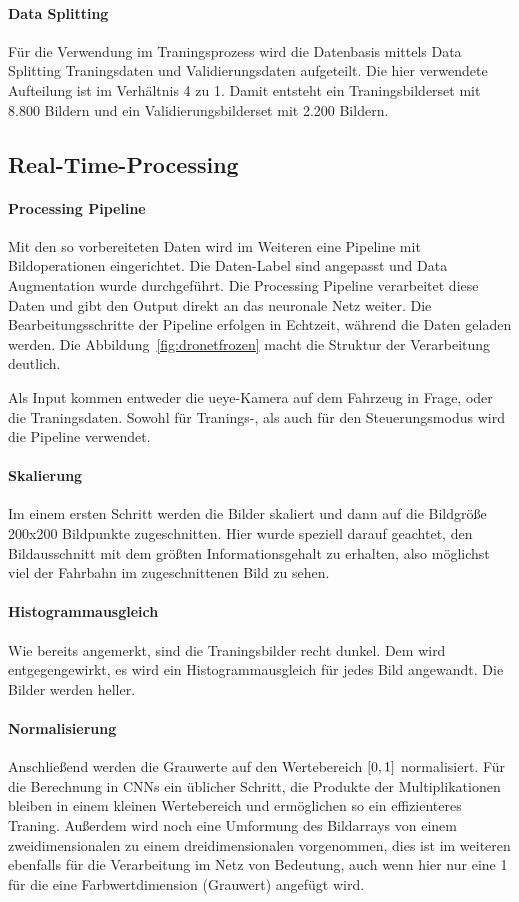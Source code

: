 \paragraph{Data Splitting}
Für die Verwendung im Traningsprozess wird die Datenbasis mittels Data Splitting \cite{picard1990data} \cite{reitermanova2010data}  Traningsdaten und Validierungsdaten aufgeteilt. Die hier verwendete Aufteilung ist im Verhältnis 4 zu 1. Damit entsteht ein Traningsbilderset mit 8.800 Bildern und ein Validierungsbilderset mit 2.200 Bildern.

\subsection{Real-Time-Processing}
\paragraph{Processing Pipeline}
Mit den so vorbereiteten Daten wird im Weiteren eine Pipeline mit Bildoperationen eingerichtet. Die Daten-Label sind angepasst und Data Augmentation wurde durchgeführt. Die Processing Pipeline verarbeitet diese Daten und gibt den Output direkt an das neuronale Netz weiter. Die Bearbeitungsschritte der Pipeline erfolgen in Echtzeit, während die Daten geladen werden. Die Abbildung~\ref{fig:dronetfrozen} macht die Struktur der Verarbeitung deutlich. 

Als Input kommen entweder die ueye-Kamera auf dem Fahrzeug in Frage, oder die Traningsdaten. Sowohl für Tranings-, als auch für den Steuerungsmodus wird die Pipeline verwendet. 

\paragraph{Skalierung}
Im einem ersten Schritt werden die Bilder skaliert und dann auf die Bildgröße 200x200 Bildpunkte zugeschnitten. Hier wurde speziell darauf geachtet, den Bildausschnitt mit dem größten Informationsgehalt zu erhalten, also möglichst viel der Fahrbahn im zugeschnittenen Bild zu sehen.

\paragraph{Histogrammausgleich}
Wie bereits angemerkt, sind die Traningsbilder recht dunkel. Dem wird entgegengewirkt, es wird ein Histogrammausgleich für jedes Bild angewandt. Die Bilder werden heller.

\paragraph{Normalisierung}
Anschließend werden die Grauwerte auf den Wertebereich $\interval{0}{1}$ normalisiert. Für die Berechnung in CNNs ein üblicher Schritt, die Produkte der Multiplikationen bleiben in einem kleinen Wertebereich und ermöglichen so ein effizienteres Traning. Außerdem wird noch eine Umformung des Bildarrays von einem zweidimensionalen zu einem dreidimensionalen vorgenommen, dies ist im weiteren ebenfalls für die Verarbeitung im Netz von Bedeutung, auch wenn hier nur eine 1 für die eine Farbwertdimension (Grauwert) angefügt wird.

